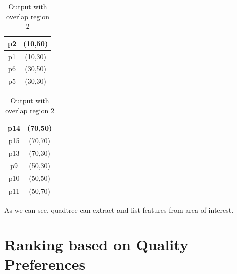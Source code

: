 \begin{table}[h]
    \centering
    \begin{tabular}{ |c|c| } 
     \hline
        p2 & (10,50)\\
        \hline
        p1 & (10,30)\\
        \hline
        p6 & (30,50)\\
        \hline
        p5 & (30,30)\\
        \hline
    \end{tabular}
    \caption{Output with overlap region 1}

    \begin{tabular}{|c|c|}
        \hline
        p14 & (70,50)\\
        \hline
        p15 & (70,70)\\
        \hline
        p13 & (70,30)\\
        \hline
        p9  & (50,30)\\
        \hline
        p10 & (50,50)\\
        \hline
        p11 & (50,70)\\
        \hline 
    \end{tabular}
    \caption{Output with overlap region 2}
\end{table}
\par As we can see, quadtree can extract and list features from area of interest.

\section{Ranking based on Quality Preferences}

